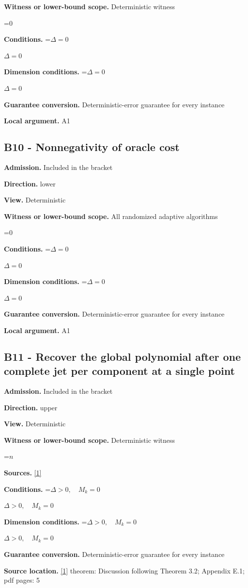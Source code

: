 \documentclass[10pt,a4paper]{article}
\newcommand{\AtlasMath}[1]{\par\begingroup\centering\setbox0=\hbox{$\displaystyle #1$}\ifdim\wd0>1.4\linewidth\typeout{ATLAS WIDE FORMULA: \the\wd0}\fi\ifdim\wd0>\linewidth\resizebox{\linewidth}{!}{\box0}\else\box0\fi\par\endgroup}
\newcommand{\AtlasInlineMath}[1]{\begingroup\setbox0=\hbox{$#1$}\ifdim\wd0>.4\linewidth\endgroup\AtlasMath{#1}\else\endgroup$#1$\fi}
\begin{document}
\textbf{Witness or lower-bound scope.} Deterministic witness

\AtlasMath{0}
\textbf{Conditions.} \AtlasInlineMath{\Delta=0}

\textbf{Dimension conditions.} \AtlasInlineMath{\Delta=0}

\textbf{Guarantee conversion.} Deterministic-error guarantee for every instance

\textbf{Local argument.} A1

\subsection{B10 - Nonnegativity of oracle cost}
\textbf{Admission.} Included in the bracket

\textbf{Direction.} lower

\textbf{View.} Deterministic

\textbf{Witness or lower-bound scope.} All randomized adaptive algorithms

\AtlasMath{0}
\textbf{Conditions.} \AtlasInlineMath{\Delta=0}

\textbf{Dimension conditions.} \AtlasInlineMath{\Delta=0}

\textbf{Guarantee conversion.} Deterministic-error guarantee for every instance

\textbf{Local argument.} A1

\subsection{B11 - Recover the global polynomial after one complete jet per component at a single point}
\textbf{Admission.} Included in the bracket

\textbf{Direction.} upper

\textbf{View.} Deterministic

\textbf{Witness or lower-bound scope.} Deterministic witness

\AtlasMath{n}
\textbf{Sources.} \href{https://arxiv.org/pdf/2609.28202v2}{[1]}

\textbf{Conditions.} \AtlasInlineMath{\Delta>0,\quad M_k=0}

\textbf{Dimension conditions.} \AtlasInlineMath{\Delta>0,\quad M_k=0}

\textbf{Guarantee conversion.} Deterministic-error guarantee for every instance

\textbf{Source location.} \href{https://arxiv.org/pdf/2609.28202v2}{[1]} theorem: Discussion following Theorem 3.2; Appendix E.1; pdf pages: 5
\end{document}
